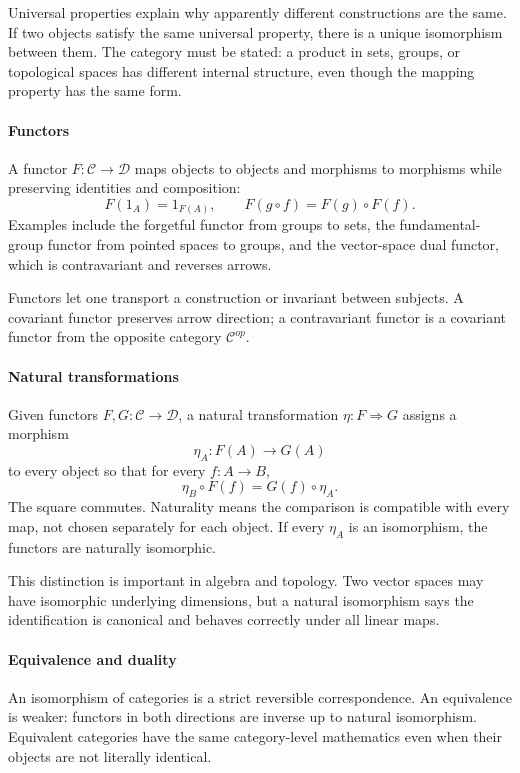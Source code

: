 Universal properties explain why apparently different constructions are the same. If two objects satisfy the same universal property, there is a unique isomorphism between them. The category must be stated: a product in sets, groups, or topological spaces has different internal structure, even though the mapping property has the same form.

\paragraph{Functors}

A functor $F:\mathcal C\to\mathcal D$ maps objects to objects and morphisms to morphisms while preserving identities and composition:
\[
 F(1_A)=1_{F(A)},\qquad F(g\circ f)=F(g)\circ F(f).
\]
Examples include the forgetful functor from groups to sets, the fundamental-group functor from pointed spaces to groups, and the vector-space dual functor, which is contravariant and reverses arrows.

Functors let one transport a construction or invariant between subjects. A covariant functor preserves arrow direction; a contravariant functor is a covariant functor from the opposite category $\mathcal C^{op}$.

\paragraph{Natural transformations}

Given functors $F,G:\mathcal C\to\mathcal D$, a natural transformation $\eta:F\Rightarrow G$ assigns a morphism
\[
 \eta_A:F(A)\to G(A)
\]
to every object so that for every $f:A\to B$,
\[
 \eta_B\circ F(f)=G(f)\circ\eta_A.
\]
The square commutes. Naturality means the comparison is compatible with every map, not chosen separately for each object. If every $\eta_A$ is an isomorphism, the functors are naturally isomorphic.

This distinction is important in algebra and topology. Two vector spaces may have isomorphic underlying dimensions, but a natural isomorphism says the identification is canonical and behaves correctly under all linear maps.

\paragraph{Equivalence and duality}

An isomorphism of categories is a strict reversible correspondence. An equivalence is weaker: functors in both directions are inverse up to natural isomorphism. Equivalent categories have the same category-level mathematics even when their objects are not literally identical.

